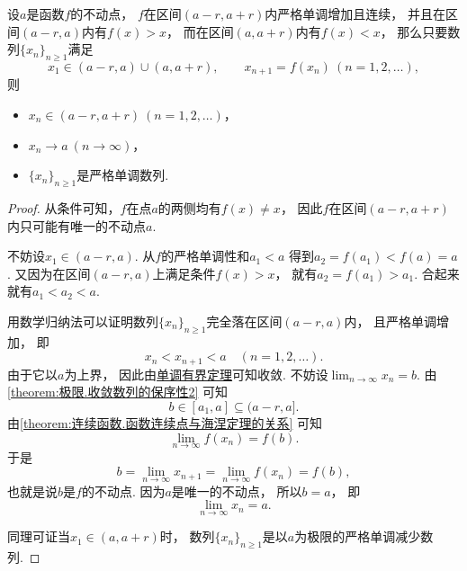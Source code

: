 \begin{proposition}\label{theorem:连续函数.单调迭代数列收敛定理}
设\(a\)是函数\(f\)的不动点，
\(f\)在区间\((a-r,a+r)\)内严格单调增加且连续，
并且在区间\((a-r,a)\)内有\(f(x)>x\)，
而在区间\((a,a+r)\)内有\(f(x)<x\)，
那么只要数列\(\{x_n\}_{n\geq1}\)满足\begin{equation*}
	x_1 \in (a-r,a)\cup(a,a+r),
	\qquad
	x_{n+1} = f(x_n)\ (n=1,2,\dotsc),
\end{equation*}
则\begin{itemize}
	\item \(x_n \in (a-r,a+r)\ (n=1,2,\dotsc)\)，
	\item \(x_n \to a\ (n\to\infty)\)，
	\item \(\{x_n\}_{n\geq1}\)是严格单调数列.
\end{itemize}
\begin{proof}
从条件可知，\(f\)在点\(a\)的两侧均有\(f(x) \neq x\)，
因此\(f\)在区间\((a-r,a+r)\)内只可能有唯一的不动点\(a\).

不妨设\(x_1 \in (a-r,a)\).
从\(f\)的严格单调性和\(a_1 < a\)
得到\(a_2 = f(a_1) < f(a) = a\).
又因为在区间\((a-r,a)\)上满足条件\(f(x) > x\)，
就有\(a_2 = f(a_1) > a_1\).
合起来就有\(a_1 < a_2 < a\).

用数学归纳法可以证明数列\(\{x_n\}_{n\geq1}\)完全落在区间\((a-r,a)\)内，
且严格单调增加，
即\begin{equation*}
	x_n < x_{n+1} < a
	\quad(n=1,2,\dotsc).
\end{equation*}
由于它以\(a\)为上界，
因此由\hyperref[theorem:极限.数列的单调有界定理]{单调有界定理}可知收敛.
不妨设\(\lim_{n\to\infty} x_n = b\).
由\cref{theorem:极限.收敛数列的保序性2} 可知\begin{equation*}
	b \in [a_1,a] \subseteq (a-r,a].
\end{equation*}
由\cref{theorem:连续函数.函数连续点与海涅定理的关系} 可知\begin{equation*}
	\lim_{n\to\infty} f(x_n) = f(b).
\end{equation*}
于是\begin{equation*}
	b = \lim_{n\to\infty} x_{n+1}
	= \lim_{n\to\infty} f(x_n)
	= f(b),
\end{equation*}
也就是说\(b\)是\(f\)的不动点.
因为\(a\)是唯一的不动点，
所以\(b = a\)，
即\begin{equation*}
	\lim_{n\to\infty} x_n = a.
\end{equation*}

同理可证当\(x_1 \in (a,a+r)\)时，
数列\(\{x_n\}_{n\geq1}\)是以\(a\)为极限的严格单调减少数列.
\end{proof}
\end{proposition}
